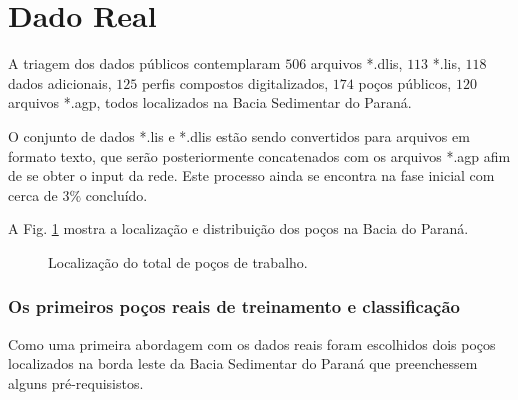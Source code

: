 \section{Dado Real}

A triagem dos dados públicos contemplaram  $506$ arquivos *.dlis, $113$ *.lis, $118$ dados adicionais, $125$ perfis compostos digitalizados, $174$ poços públicos, $120$ arquivos *.agp, todos localizados na Bacia Sedimentar do Paraná. 

O conjunto de dados *.lis e *.dlis estão sendo convertidos para arquivos em formato texto, que serão posteriormente concatenados  com os arquivos *.agp afim de se obter o input da rede. Este processo ainda se encontra na fase inicial com cerca de $3\%$ concluído.

A Fig. \ref{real} mostra a localização e distribuição dos poços na Bacia do Paraná.

\begin{figure}[H]
	\centering
	\setlength{\fboxsep}{8pt}
	\setlength{\fboxrule}{0.1pt}
	\caption{Localização do total de poços de trabalho.}
	\label{real}
\end{figure}

\subsubsection{Os primeiros poços reais de treinamento e classificação}

Como uma primeira abordagem com os dados reais foram escolhidos dois poços localizados na borda leste da Bacia Sedimentar do Paraná que preenchessem alguns pré-requisistos.

